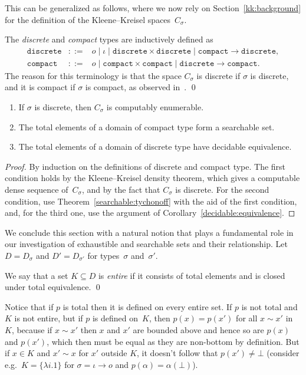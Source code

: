 \documentclass{LMCS}
\newcommand{\True}{1}\newcommand{\False}{0}\newcommand{\domain}[1]{{\D_{#1}}}
\newcommand{\D}{D}
\begin{document}
This can be generalized as follows, where we now rely on
Section~\ref{kk:background} for the definition of the Kleene--Kreisel
spaces~$C_\sigma$.  
\begin{defi} \label{discrete:compact}
The \emph{discrete} and \emph{compact}
types are inductively defined as
\newcommand{\discrete}{\mathtt{discrete}}
\newcommand{\compact}{\mathtt{compact}}
\begin{eqnarray*}
\discrete & ::= & o \mid \iota \mid \discrete \times \discrete \mid \compact \to \discrete, \\
\compact & ::= & o \mid \compact \times \compact \mid \discrete \to \compact.
\end{eqnarray*}
The reason for this terminology is that the space $C_{\sigma}$ is
discrete if $\sigma$ is discrete, and it is compact if $\sigma$ is
compact, as observed in~\cite{escardo:barbados}. \qed
\end{defi}
\pagebreak[3]
\begin{thm} \label{thm:discrete:compact}
\leavevmode
\begin{enumerate}
\item If $\sigma$ is discrete, then $C_{\sigma}$ is computably enumerable. 
\item The total elements of a domain of compact type form a searchable set.
\item The total elements of a domain of discrete type have decidable equivalence.
\end{enumerate}
\end{thm}
\begin{proof}
  By induction on the definitions of discrete and compact type.  The
  first condition holds by the Kleene--Kreisel density theorem, which
  gives a computable dense sequence of~$C_\sigma$, and by the fact
  that $C_\sigma$ is discrete.  For the second condition, use
  Theorem~\ref{searchable:tychonoff} with the aid of the first
  condition, and, for the third one, use the argument of
  Corollary~\ref{decidable:equivalence}.
\end{proof}

We conclude this section with a natural notion that plays a
fundamental role in our investigation of exhaustible and searchable
sets and their relationship. Let $D=D_{\sigma}$ and $D'=D_{\sigma'}$
for types~$\sigma$ and~$\sigma'$.
\begin{defi} \label{def:entire} We say that a set $K \subseteq
  D$ is \emph{entire} if it consists of total elements and is
  closed under total equivalence. \qed
\end{defi}
Notice that if $p$ is total then it is defined on every entire set.
If $p$ is not total and $K$ is not entire, but if $p$ is defined
on~$K$, then $p(x) = p(x')$ for all $x \sim x'$ in $K$, because if $x
\sim x'$ then $x$ and $x'$ are bounded above and hence so are $p(x)$
and $p(x')$, which then must be equal as they are non-bottom by
definition.  But if $x \in K$ and $x' \sim x$ for $x'$ outside $K$, it
doesn't follow that $p(x') \ne \bot$ (consider e.g.\ $K=\{\lambda
i.\True\}$ for $\sigma=\iota \to o$ and $p(\alpha)=\alpha(\bot)$).
\end{document}
